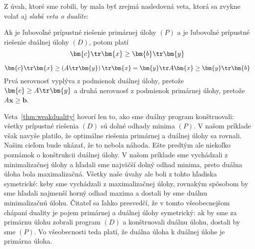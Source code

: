 \noindent
Z úvah, ktoré sme robili, by mala byť zrejmá nasledovná veta, ktorá sa zvykne volať aj {\em slabá
veta o dualite}:

\begin{veta}\label{thm:weakduality}
  Ak  je ľubovoľné prípustné riešenie primárnej úlohy $(P)$ a  je ľubovoľné prípustné riešenie 
  duálnej úlohy $(D)$, 
  potom platí
$$\bm{c}\tr\bm{x}\ge\bm{b}\tr\bm{y}$$
\end{veta}
\begin{dokaz}
\begin{equation}
\label{eq:weakduality}
\bm{c}\tr\bm{x}\ge\left(A\tr\bm{y}\right)\tr\bm{x}=\bm{y}\tr A\bm{x}\ge\bm{y}\tr\bm{b}
\end{equation}
Prvá nerovnosť vyplýva z podmienok duálnej úlohy, pretože $\bm{c}\ge A\tr\bm{y}$ a druhá nerovnosť z podmienok primárnej úlohy, pretože $A\bm{x}\ge\bm{b}$.
\end{dokaz}

\noindent Veta~\ref{thm:weakduality} hovorí len to, ako sme duálny program
konštruovali: všetky prípustné riešenia $(D)$ sú dolné odhady minima $(P)$. V
našom príklade však navyše platilo, že optimálne riešenia primárnej a duálnej
úlohy sa rovnali. Našim cieľom bude ukázať, že to nebola náhoda.  Ešte predtým
ale niekoľko poznámok o konštrukcii duálnej úlohy. V našom príklade sme
vychádzali z minimalizačnej úlohy a hľadali sme najväčší dolný odhad minima,
preto duálna úloha bola maximalizačná. Všetky naše úvahy ale boli z tohto
hľadiska symetrické: keby sme vychádzali z maximalizačnej úlohy, rovnakým
spôsobom by sme hľadali najmenší horný odhad maxima a dostali by sme duálnu
minimalizačnú úlohu. Čitateľ sa ľahko presvedčí, že v tomto všeobecnejšom
chápaní duality je pojem primárnej a duálnej úlohy symetrický: ak by sme za
primárnu úlohu zobrali program $(D)$ a konštruovali duálnu úlohu, dostali by
sme $(P)$. Vo všeobecnosti teda platí, že duálna úloha k duálnej úlohe je
primárna úloha. 


